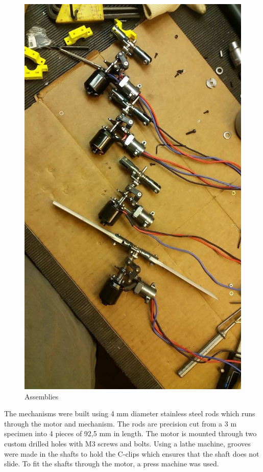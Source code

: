 \begin{figure}[h]
\begin{minipage}[t]{0.3\textwidth}
            \includegraphics[width = \textwidth]{VAPIQ-PICTURES/VPQassemblies}
            \caption{Assemblies}
            \label{fig:}
        \end{minipage}
\end{figure}

The mechanisms were built using 4 mm diameter stainless steel rods which runs through the motor and mechanism. The rods are precision cut from a 3 m specimen into 4 pieces of 92,5 mm in length. 
The motor is mounted through two custom drilled holes with M3 screws and bolts. Using a lathe machine, grooves were made in the shafts to hold the C-clips which ensures that the shaft does not slide. To fit the shafts through the motor, a press machine was used.


